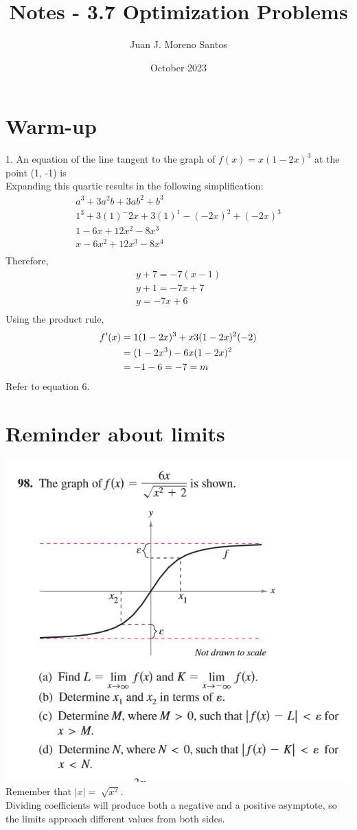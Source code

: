 \documentclass[11pt]{article}
\title{Notes - 3.7 Optimization Problems}
\author{Juan J. Moreno Santos}
\date{October 2023}
\newcommand*{\set}{\setcounter{equation}{0}}
\begin{document}
\maketitle

\section{Warm-up}
1. An equation of the line tangent to the graph of $f(x)=x(1-2x)^3$ at the point (1, -1) is\\
Expanding this quartic results in the following simplification:
\begin{align}
    a^3+3a^2b+3ab^2+b^3\\
    1^3+3(1)^-2x+3(1)^1-(-2x)^2+(-2x)^3\\
    1-6x+12x^2-8x^3\\
    x-6x^2+12x^3-8x^4\\
\end{align}
Therefore,
\begin{align}
    y+7=-7(x-1)\\
    y+1=-7x+7\\
    y=-7x+6\\
\end{align}
Using the product rule,
\begin{align}
    \set
    f'(x)&=1(1-2x)^3+x3(1-2x)^2(-2)\\
    &=(1-2x^3)-6x(1-2x)^2\\
    &=-1-6=-7=m
\end{align}
Refer to equation 6.

\section{Reminder about limits}
\includegraphics{firefox_H3E8UqRM15.png}\\
Remember that $|x|=\sqrt[]{x^2}$.\\
Dividing coefficients will produce both a negative and a positive asymptote, so the limits approach different values from both sides.
\end{document}
